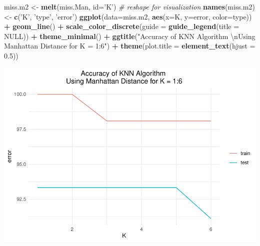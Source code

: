\documentclass[
]{article}
\newenvironment{Shaded}{\begin{snugshade}}{\end{snugshade}}
\newcommand{\CharTok}[1]{\textcolor[rgb]{0.31,0.60,0.02}{#1}}
\newcommand{\CommentTok}[1]{\textcolor[rgb]{0.56,0.35,0.01}{\textit{#1}}}
\newcommand{\DataTypeTok}[1]{\textcolor[rgb]{0.13,0.29,0.53}{#1}}
\newcommand{\FloatTok}[1]{\textcolor[rgb]{0.00,0.00,0.81}{#1}}
\newcommand{\KeywordTok}[1]{\textcolor[rgb]{0.13,0.29,0.53}{\textbf{#1}}}
\newcommand{\NormalTok}[1]{#1}
\newcommand{\OperatorTok}[1]{\textcolor[rgb]{0.81,0.36,0.00}{\textbf{#1}}}
\newcommand{\OtherTok}[1]{\textcolor[rgb]{0.56,0.35,0.01}{#1}}
\newcommand{\StringTok}[1]{\textcolor[rgb]{0.31,0.60,0.02}{#1}}
\begin{document}
\begin{Shaded}
\begin{Highlighting}[]
\NormalTok{miss.m2 <-}\StringTok{ }\KeywordTok{melt}\NormalTok{(miss.Man, }\DataTypeTok{id=}\StringTok{'K'}\NormalTok{) }\CommentTok{# reshape for visualization}
\KeywordTok{names}\NormalTok{(miss.m2) <-}\StringTok{ }\KeywordTok{c}\NormalTok{(}\StringTok{'K'}\NormalTok{, }\StringTok{'type'}\NormalTok{, }\StringTok{'error'}\NormalTok{)}
\KeywordTok{ggplot}\NormalTok{(}\DataTypeTok{data=}\NormalTok{miss.m2, }\KeywordTok{aes}\NormalTok{(}\DataTypeTok{x=}\NormalTok{K, }\DataTypeTok{y=}\NormalTok{error, }\DataTypeTok{color=}\NormalTok{type)) }\OperatorTok{+}\StringTok{ }\KeywordTok{geom_line}\NormalTok{() }\OperatorTok{+}
\StringTok{       }\KeywordTok{scale_color_discrete}\NormalTok{(}\DataTypeTok{guide =} \KeywordTok{guide_legend}\NormalTok{(}\DataTypeTok{title =} \OtherTok{NULL}\NormalTok{)) }\OperatorTok{+}\StringTok{ }\KeywordTok{theme_minimal}\NormalTok{() }\OperatorTok{+}
\StringTok{       }\KeywordTok{ggtitle}\NormalTok{(}\StringTok{"Accuracy of KNN Algorithm }\CharTok{\textbackslash{}n}\StringTok{Using Manhattan Distance for K = 1:6"}\NormalTok{) }\OperatorTok{+}\StringTok{ }\KeywordTok{theme}\NormalTok{(}\DataTypeTok{plot.title =} \KeywordTok{element_text}\NormalTok{(}\DataTypeTok{hjust =} \FloatTok{0.5}\NormalTok{))}
\end{Highlighting}
\end{Shaded}

\includegraphics{assessment-1_files/figure-latex/unnamed-chunk-8-2.pdf}
\end{document}

